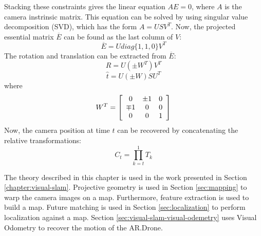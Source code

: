 Stacking these constraints gives the linear equation $A E = 0$, where $A$ is the camera instrinsic matrix.
This equation can be solved by using singular value decomposition (SVD), which has the form $A = USV^T$.
Now, the projected essential matrix $\overline{E}$ can be found as the last column of $V$:
\begin{equation}
\overline{E} = U diag\{1, 1, 0\} V^T
\end{equation}
The rotation and translation can be extracted from $\overline{E}$:
\begin{equation}
R = U (\pm W^T) V^T
\end{equation}
\begin{equation}
\hat{t} = U (\pm W) S U^T
\end{equation}
where
\begin{equation}
W^T =
\left[ \begin{array}{c c c}
0 & \pm 1 & 0 \\
\mp 1 & 0 & 0 \\
0 & 0 & 1
\end{array} \right]
\end{equation}
Now, the camera position at time $t$ can be recovered by concatenating the relative transformations:
\begin{equation}
C_t = \prod_{k=t}^1T_{k}
\end{equation}

The theory described in this chapter is used in the work presented in Section \ref{chapter:visual-slam}.
Projective geometry is used in Section \ref{sec:mapping} to warp the camera images on a map.
Furthermore, feature extraction is used to build a map.
Future matching is used in Section \ref{sec:localization} to perform localization against a map.
Section \ref{sec:visual-slam-visual-odemetry} uses Visual Odometry to recover the motion of the AR.Drone.
